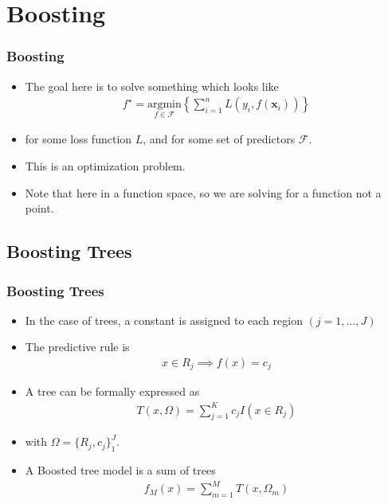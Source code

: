 \documentclass[
  shownotes,
  xcolor={svgnames},
  hyperref={colorlinks,citecolor=DarkBlue,linkcolor=DarkRed,urlcolor=DarkBlue}
  , aspectratio=169]{beamer}
\begin{document}
\section{Boosting}
\begin{frame}[fragile]
\frametitle{Boosting}

\begin{itemize}


\item The goal here is to solve something which looks like
\begin{align}
f^\star=\underset{f\in\mathcal{F}}{\text{argmin}}\left\lbrace \sum_{i=1}^n L(y_i,f(\mathbf{x}_i)) \right\rbrace
\end{align}


\item for some loss function $L$, and for some set of predictors $\mathcal{F}$. 

\item This is an optimization problem. 
\item Note that here in a function space, so we are solving for a function not a point.
\end{itemize}


\end{frame}
\subsection{Boosting Trees}
\begin{frame}[fragile]
\frametitle{Boosting Trees}

\begin{itemize}


\item In the case of trees, a constant is assigned to each region $(j=1,\dots,J)$ 
\item The predictive rule is
\begin{align}
x \in R_j\implies f(x)=c_j
\end{align}

\item A tree can be formally expressed as 
\begin{align}
T(x,\Omega)=\sum_{j=1}^K c_j I(x\in R_j)
\end{align}

\item with $\Omega=\{R_j,c_j\}^J_1$.
\item A Boosted tree model is a sum of trees
\begin{align}
f_M(x)=\sum_{m=1}^MT(x,\Omega_m)
\end{align}
\end{itemize}
 \end{frame}
\end{document}
